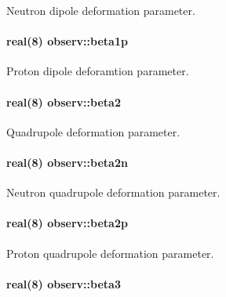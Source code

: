 Neutron dipole deformation parameter. 

\paragraph[{\texorpdfstring{beta1p}{beta1p}}]{\setlength{\rightskip}{0pt plus 5cm}real(8) observ\+::beta1p}\hypertarget{namespaceobserv_acedfdb84c130c7157e337792dcaf8d65}{}\label{namespaceobserv_acedfdb84c130c7157e337792dcaf8d65}


Proton dipole deforamtion parameter. 

\paragraph[{\texorpdfstring{beta2}{beta2}}]{\setlength{\rightskip}{0pt plus 5cm}real(8) observ\+::beta2}\hypertarget{namespaceobserv_a8e4f6f99ecdb81e5aea163822de8628a}{}\label{namespaceobserv_a8e4f6f99ecdb81e5aea163822de8628a}


Quadrupole deformation parameter. 

\paragraph[{\texorpdfstring{beta2n}{beta2n}}]{\setlength{\rightskip}{0pt plus 5cm}real(8) observ\+::beta2n}\hypertarget{namespaceobserv_ab7441a7793132b9693129241f9226285}{}\label{namespaceobserv_ab7441a7793132b9693129241f9226285}


Neutron quadrupole deformation parameter. 

\paragraph[{\texorpdfstring{beta2p}{beta2p}}]{\setlength{\rightskip}{0pt plus 5cm}real(8) observ\+::beta2p}\hypertarget{namespaceobserv_ac3de9feb22a0044fec5f0fc73f3de8f2}{}\label{namespaceobserv_ac3de9feb22a0044fec5f0fc73f3de8f2}


Proton quadrupole deformation parameter. 

\paragraph[{\texorpdfstring{beta3}{beta3}}]{\setlength{\rightskip}{0pt plus 5cm}real(8) observ\+::beta3}\hypertarget{namespaceobserv_a0fde5336c5d78c45821b53538f702dfb}{}\label{namespaceobserv_a0fde5336c5d78c45821b53538f702dfb}


